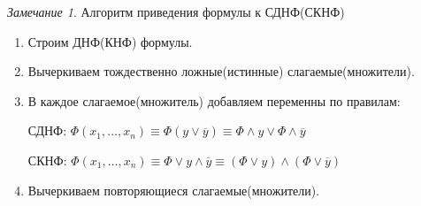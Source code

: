 \documentclass[a4paper]{article}
\theoremstyle{definition}
\theoremstyle{remark}
\newtheorem*{remark}{Замечание}
\begin{document}
	\begin{remark}
		Алгоритм приведения формулы к СДНФ(СКНФ)
		\begin{enumerate}
			\item Строим ДНФ(КНФ) формулы.
			\item Вычеркиваем тождественно ложные(истинные) слагаемые(множители).
			\item В каждое слагаемое(множитель) добавляем переменны по правилам:

				СДНФ: $\Phi(x_1, \dots , x_n) \equiv \Phi(y \vee \overline{y}) \equiv \Phi \wedge y \vee \Phi \wedge \overline{y}$
				
				СКНФ: $\Phi(x_1, \dots , x_n) \equiv \Phi \vee y \wedge \overline{y} \equiv (\Phi \vee y) \wedge (\Phi \vee \overline{y})$
			\item Вычеркиваем повторяющиеся слагаемые(множители).
		\end{enumerate}
	\end{remark}
\end{document}
